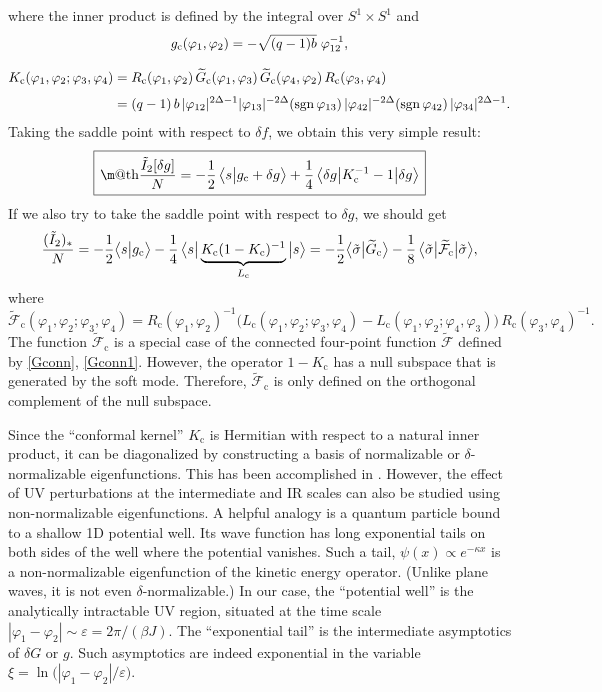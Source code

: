 \documentclass[12pt]{article}
\makeatletter
\newcommand*{\wideboxed}[1]{\setlength{\fboxsep}{1ex}%
  \fbox{\m@th$\displaystyle#1$}}
\newcommand{\blangle}{\bigl\langle}
\newcommand{\brangle}{\bigr\rangle}
\newcommand*{\bbraa}[1]{\blangle{#1}\big|}
\newcommand*{\bkett}[1]{\big|{#1}\brangle}
\newcommand*{\bbrakett}[2]{\blangle{#1}\big|{#2}\brangle}
\newcommand{\calF}{\mathcal{F}}
\DeclareMathOperator{\sgn}{sgn}
\newcommand{\cc}{\mathrm{c}}
\newcommand{\tI}{\tilde{I}}
\newcommand{\tG}{\widetilde{G}}
\newcommand{\tF}{\widetilde{\calF}}
\newcommand{\tsig}{\tilde{\sigma}}
\newcommand{\vep}{\varepsilon}
\newcommand{\vp}{\varphi}
\makeatother
\begin{document}
where the inner product is defined by the integral over $S^1\times S^1$ and
\begin{gather}
g_{\cc}(\vp_1,\vp_2) =-\sqrt{(q-1)b}\kern3pt\vp_{12}^{-1},
\\[8pt]
\label{Kckernel}
\begin{aligned}
K_{\cc}(\vp_1,\vp_2;\vp_3,\vp_4)
&=R_{\cc}(\vp_1,\vp_2)\,
\tG_{\cc}(\vp_1,\vp_3)\,\tG_{\cc}(\vp_4,\vp_2)\,
R_{\cc}(\vp_3,\vp_4)\\[3pt]
&=(q-1)\,b\,|\vp_{12}|^{2\Delta-1}|\vp_{13}|^{-2\Delta}(\sgn\vp_{13})\,
|\vp_{42}|^{-2\Delta}(\sgn\vp_{42})\,|\vp_{34}|^{2\Delta-1}.
\end{aligned}
\end{gather}
Taking the saddle point with respect to $\delta f$, we obtain this very simple result:
\begin{equation} \label{I2}
\wideboxed{
\frac{\tI_2[\delta g]}{N}
=-\frac{1}{2}\,\bbrakett{s}{g_{\cc}+\delta g}
+\frac{1}{4}\,\bbraa{\delta g}K_{\cc}^{-1}-1\bkett{\delta g}
}
\end{equation}
If we also try to take the saddle point with respect to $\delta g$, we should get
\begin{equation}\label{I2star}
\frac{(\tI_2)_{*}}{N}
=-\frac{1}{2}\bbrakett{s}{g_{\cc}}
-\frac{1}{4}\,\bbraa{s}\underbrace{K_{\cc}(1-K_{\cc})^{-1}}_{L_{\cc}}\bkett{s}
=-\frac{1}{2}\bbrakett{\tsig}{\tG_{\cc}}
-\frac{1}{8}\,\bbraa{\tsig}\tF_{\cc}\bkett{\tsig},
\vspace{-15pt}
\end{equation}
where
\begin{equation}\label{Fc0}
\tF_{\cc}(\vp_1,\vp_2;\vp_3,\vp_4)
=R_{\cc}(\vp_1,\vp_2)^{-1}
\bigl(L_{\cc}(\vp_1,\vp_2;\vp_3,\vp_4)-L_{\cc}(\vp_1,\vp_2;\vp_4,\vp_3)\bigr)\,
R_{\cc}(\vp_3,\vp_4)^{-1}.
\end{equation}
The function $\tF_{\cc}$ is a special case of the connected four-point function $\tF$ defined by \eqref{Gconn}, \eqref{Gconn1}. However, the operator $1-K_{\cc}$ has a null subspace that is generated by the soft mode. Therefore, $\tF_{\cc}$ is only defined on the orthogonal complement of the null subspace.

Since the ``conformal kernel'' $K_{\cc}$ is Hermitian with respect to a natural inner product, it can be diagonalized by constructing a basis of normalizable or $\delta$-normalizable eigenfunctions. This has been accomplished in \cite{PoRo16,MS16}. However, the effect of UV perturbations at the intermediate and IR scales can also be studied using non-normalizable eigenfunctions. A helpful analogy is a quantum particle bound to a shallow 1D potential well. Its wave function has long exponential tails on both sides of the well where the potential vanishes. Such a tail, $\psi(x)\propto e^{-\kappa x}$ is a non-normalizable eigenfunction of the kinetic energy operator. (Unlike plane waves, it is not even $\delta$-normalizable.) In our case, the ``potential well'' is the analytically intractable UV region, situated at the time scale $|\vp_1-\vp_2|\sim\vep=2\pi/(\beta J)$. The ``exponential tail'' is the intermediate asymptotics of $\delta G$ or $g$. Such asymptotics are indeed exponential in the variable $\xi=\ln\bigl(|\vp_1-\vp_2|/\vep\bigr)$.
\end{document}
